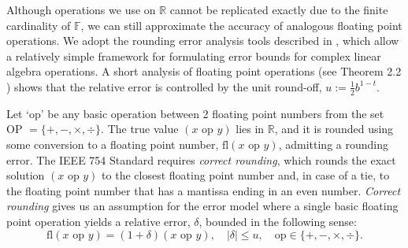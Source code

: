 \documentclass[review,onefignum,onetabnum]{siamart190516}
\newcommand{\R}{\mathbb{R}}
\newcommand{\F}{\mathbb{F}}
\newcommand{\dd}{\delta}
\newcommand{\fl}{\mathrm{fl}}
\begin{document}
Although operations we use on $\R$ cannot be replicated exactly due to the finite cardinality of $\F$, we can still approximate the accuracy of analogous floating point operations.
We adopt the rounding error analysis tools described in \cite{Higham2002}, which allow a relatively simple framework for formulating error bounds for complex linear algebra operations. 
A short analysis of floating point operations (see Theorem 2.2 \cite{Higham2002}) shows that the relative error is 
controlled by the unit round-off, $u:=\frac{1}{2}b^{1-t}$. \par 

Let `op' be any basic operation between 2 floating point numbers from the set OP $=\{+, -, \times, \div\}$.
The true value $(x\text{ op }y)$ lies in $\R$, and it is rounded using some conversion to a floating point number, $\fl(x\text{ op }y)$, admitting a rounding error. 
The IEEE 754 Standard requires \emph{correct rounding}, which rounds the exact solution $(x\text{ op }y)$ to the closest floating point number and, in case of a tie, to the floating point number that has a mantissa ending in an even number.
\emph{Correct rounding} gives us an assumption for the error model where a single basic floating point operation yields a relative error, $\dd$, bounded in the following sense:
\begin{equation}
\fl(x\text{ op }y) = (1 + \dd)(x\text{ op }y),\quad |\dd|\leq u, \quad \text{op}\in\{+, -, \times, \div\}. \label{eqn:singlefpe}
\end{equation}
\end{document}
